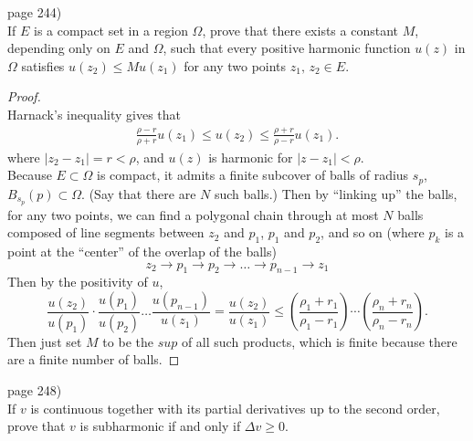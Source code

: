 \documentclass{article}
\newenvironment{problem}[2][Problem]{\begin{trivlist}
\item[\hskip \labelsep {\bfseries #1}\hskip \labelsep {\bfseries #2.}]}{\end{trivlist}}
\begin{document}
\begin{problem}{1} (page 244) \\
  If $E$ is a compact set in a region $\Omega$, prove that there exists a
  constant $M$, depending only on $E$ and $\Omega$, such that every positive
  harmonic function $u(z)$ in $\Omega$ satisfies $u(z_2) \leq Mu(z_1)$ for any
  two points $z_1,\,z_2 \in E$.
\end{problem}

\begin{proof} \text{} \\
  Harnack's inequality gives that \begin{align*}
    \frac{\rho - r}{\rho + r} u(z_1) \leq u(z_2) \leq \frac{\rho + r}{\rho - r} u(z_1).
  \end{align*}
  where $|z_2 - z_1| = r < \rho$, and $u(z)$ is harmonic for $|z - z_1| < \rho$.
  \\
  Because $E \subset \Omega$ is compact, it admits a finite subcover of balls of
  radius $s_p$, $B_{s_p}(p) \subset \Omega$.
  (Say that there are $N$ such balls.)
  Then by ``linking up'' the balls, for any two points, we can find a polygonal
  chain through at most $N$ balls composed of line segments between $z_2$ and
  $p_1$, $p_1$ and $p_2$, and so on
  (where $p_k$ is a point at the ``center'' of the overlap of the balls) \[
    z_2 \rightarrow p_1 \rightarrow p_2 \rightarrow \hdots \rightarrow p_{n - 1} \rightarrow z_1
  \]
  Then by the positivity of $u$, \[
    \frac{u(z_2)}{u(p_1)}\cdot\frac{u(p_1)}{u(p_2)}\hdots\frac{u(p_{n-1})}{u(z_1)}
    = \frac{u(z_2)}{u(z_1)}
    \leq \left(\frac{\rho_1 + r_1}{\rho_1 - r_1}\right)\cdots
      \left(\frac{\rho_n + r_n}{\rho_n - r_n}\right).
  \]
  Then just set $M$ to be the $sup$ of all such products, which is finite because
  there are a finite number of balls.
\end{proof}
\pagebreak

\begin{problem}{3} (page 248) \\
  If $v$ is continuous together with its partial derivatives up to the second
  order, prove that $v$ is subharmonic if and only if $\Delta v \geq 0$.
\end{problem}
\end{document}
